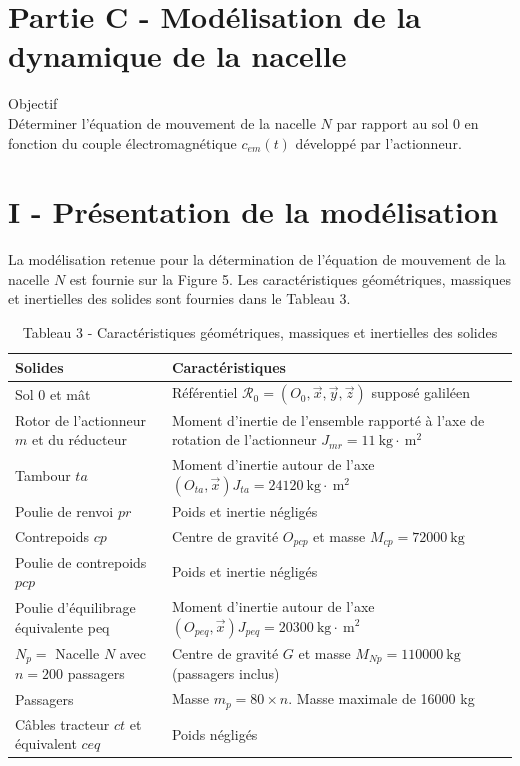 \documentclass[10pt]{article}
\begin{document}
\section*{Partie C - Modélisation de la dynamique de la nacelle}
Objectif\\
Déterminer l'équation de mouvement de la nacelle $N$ par rapport au sol 0 en fonction du couple électromagnétique $c_{e m}(t)$ développé par l'actionneur.

\section*{I - Présentation de la modélisation}
La modélisation retenue pour la détermination de l'équation de mouvement de la nacelle $N$ est fournie sur la Figure 5. Les caractéristiques géométriques, massiques et inertielles des solides sont fournies dans le Tableau 3.

\begin{table}[h]
\begin{center}
\begin{tabular}[t]{|l|l|}
\hline
Solides & Caractéristiques \\
\hline
Sol 0 et mât & Référentiel $\mathcal{R}_{0}=\left(O_{0}, \vec{x}, \vec{y}, \vec{z}\right)$ supposé galiléen \\
\hline
Rotor de l'actionneur $m$ et du réducteur & Moment d'inertie de l'ensemble rapporté à l'axe de rotation de l'actionneur $J_{m r}=11 \mathrm{~kg} \cdot \mathrm{~m}^{2}$ \\
\hline
Tambour $t a$ & Moment d'inertie autour de l'axe $\left(O_{t a}, \vec{x}\right) J_{t a}=24120 \mathrm{~kg} \cdot \mathrm{~m}^{2}$ \\
\hline
Poulie de renvoi $p r$ & Poids et inertie négligés \\
\hline
Contrepoids $c p$ & Centre de gravité $O_{p c p}$ et masse $M_{c p}=72000 \mathrm{~kg}$ \\
\hline
Poulie de contrepoids $p c p$ & Poids et inertie négligés \\
\hline
Poulie d'équilibrage équivalente peq & Moment d'inertie autour de l'axe $\left(O_{p e q}, \vec{x}\right) J_{p e q}=20300 \mathrm{~kg} \cdot \mathrm{~m}^{2}$ \\
\hline
$N_{p}=$ Nacelle $N$ avec $n=200$ passagers & Centre de gravité $G$ et masse $M_{N p}=110000 \mathrm{~kg}$ (passagers inclus) \\
\hline
Passagers & Masse $m_{p}=80 \times n$. Masse maximale de 16000 kg \\
\hline
Câbles tracteur $c t$ et équivalent $c e q$ & Poids négligés \\
\hline
\end{tabular}
\captionsetup{labelformat=empty}
\caption{Tableau 3 - Caractéristiques géométriques, massiques et inertielles des solides}
\end{center}
\end{table}
\end{document}

